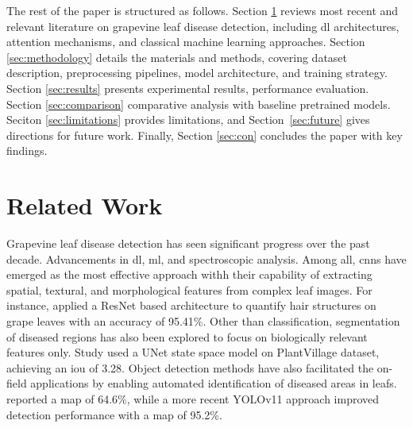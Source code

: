 \documentclass[conference]{IEEEtran}
\begin{document}
The rest of the paper is structured as follows. Section \ref{sec:rw} reviews most recent and relevant literature on grapevine leaf disease detection, including \ac{dl} architectures, attention mechanisms, and classical machine learning approaches. Section \ref{sec:methodology} details the materials and methods, covering dataset description, preprocessing pipelines, model architecture, and training strategy. Section \ref{sec:results} presents experimental results, performance evaluation. Section \ref{sec:comparison} comparative analysis with baseline pretrained models. Seciton \ref{sec:limitations} provides limitations, and Section~\ref{sec:future} gives directions for future work. Finally, Section \ref{sec:con} concludes the paper with key findings.

\section{Related Work}
\label{sec:rw}
Grapevine leaf disease detection has seen significant progress over the past decade. Advancements in \ac{dl}, \ac{ml}, and spectroscopic analysis. Among all, \ac{cnn}s have emerged as the most effective approach withh their capability of extracting spatial, textural, and morphological features from complex leaf images. For instance, \cite{Malagol2025} applied a ResNet based architecture to quantify hair structures on grape leaves with an accuracy of 95.41\%. Other than classification, segmentation of diseased regions has also been explored to focus on biologically relevant features only. Study \cite{Zhang2024GMamba} used a UNet state space model on PlantVillage dataset, achieving an \ac{iou} of 3.28. Object detection methods have also facilitated the on-field applications by enabling automated identification of diseased areas in leafs. \cite{Khan2025YOLOv7} reported a \ac{map} of 64.6\%, while a more recent YOLOv11 approach \cite{Zhou2025YOLOGrape} improved detection performance with a \ac{map} of 95.2\%.
\end{document}
